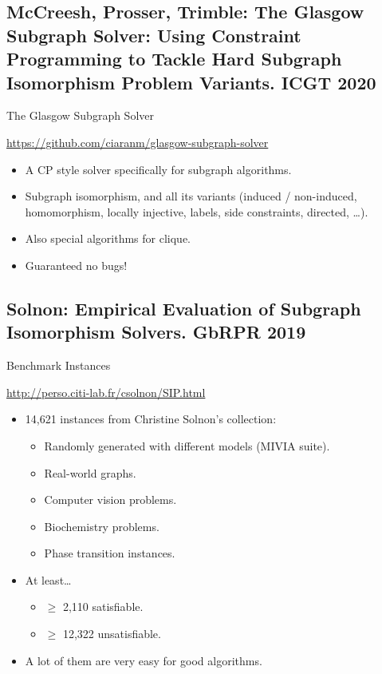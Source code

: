 \documentclass[aspectratio=169,compress,10pt]{beamer}
\begin{document}
\subsection{McCreesh, Prosser, Trimble: The Glasgow Subgraph Solver: Using
Constraint Programming to Tackle Hard Subgraph Isomorphism Problem Variants. ICGT 2020}

\begin{frame}{The Glasgow Subgraph Solver}
    \begin{center}
        \url{https://github.com/ciaranm/glasgow-subgraph-solver}
    \end{center}

    \begin{itemize}
        \item A CP style solver specifically for subgraph algorithms.
        \item Subgraph isomorphism, and all its variants (induced / non-induced, homomorphism,
            locally injective, labels, side constraints, directed, \ldots).
        \item Also special algorithms for clique.
        \item Guaranteed no bugs!
    \end{itemize}
\end{frame}

\subsection{Solnon: Empirical Evaluation of Subgraph Isomorphism Solvers. GbRPR 2019}

\begin{frame}{Benchmark Instances}
    \begin{center}
        \url{http://perso.citi-lab.fr/csolnon/SIP.html}
    \end{center}

    \begin{itemize}
        \item 14,621 instances from Christine Solnon's collection:
            \begin{itemize}
                \item Randomly generated with different models (MIVIA suite).
                \item Real-world graphs.
                \item Computer vision problems.
                \item Biochemistry problems.
                \item Phase transition instances.
            \end{itemize}
        \item At least\ldots
            \begin{itemize}
                \item $\ge$ 2,110 satisfiable.
                \item $\ge$ 12,322 unsatisfiable.
            \end{itemize}
        \item A lot of them are very easy for good algorithms.
    \end{itemize}
\end{frame}
\end{document}

